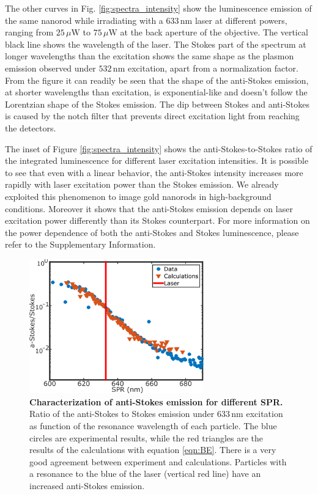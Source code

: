 \documentclass[journal=nalefd,manuscript=letter]{achemso}
\newcommand{\nm}{\ensuremath{\,\textrm{nm}}}
\newcommand{\uW}{\ensuremath{\,\mu\textrm{W}}}
\begin{document}
The other curves in Fig. \ref{fig:spectra_intensity} show the luminescence emission of
the same nanorod while irradiating with a $633\nm$ laser at different powers,
ranging from $25\uW$ to $75\uW$ at the back aperture of the objective.  
The vertical black line shows the wavelength of the laser. The Stokes part of the
spectrum at longer wavelengths than the excitation shows the same shape as the
plasmon emission observed under $532\nm$ excitation, apart from a normalization
factor. From the figure it can readily be seen that the shape of the anti-Stokes
emission, at shorter wavelengths than excitation, is exponential-like and
doesn't follow the Lorentzian shape of the Stokes emission. The dip between
Stokes and anti-Stokes is caused by the notch filter that prevents direct
excitation light from reaching the detectors. 

The inset of Figure \ref{fig:spectra_intensity} shows the anti-Stokes-to-Stokes ratio of
the integrated luminescence for different laser excitation intensities. It is
possible to see that even with a linear behavior, the anti-Stokes intensity
increases more rapidly with laser excitation power than the Stokes emission.
We already exploited this phenomenon to image gold nanorods in high-background
conditions\cite{Carattino2016a}. Moreover it shows that the anti-Stokes emission
depends on laser excitation power differently than its Stokes counterpart. For more 
information on the power dependence of both the anti-Stokes and Stokes luminescence, 
please refer to the Supplementary Information. 

\begin{figure}[tp] \centering
\includegraphics[width=75.5mm]{Figures/02_AS_vs_S_SPR/02_AS_vs_S_SPR.png}
\caption{\textbf{Characterization of anti-Stokes emission for different SPR.} 
Ratio of the anti-Stokes to Stokes emission under $633\nm$ excitation
as function of the resonance wavelength of each particle.
The blue circles are experimental results, while the red triangles are the
results of the calculations with equation \ref{eqn:BE}. There is a very
good agreement between experiment and calculations. Particles with a resonance
to the blue of the laser (vertical red line) have an increased anti-Stokes
emission.}
	\label{fig:ASS-ratio}
\end{figure}
\end{document}
